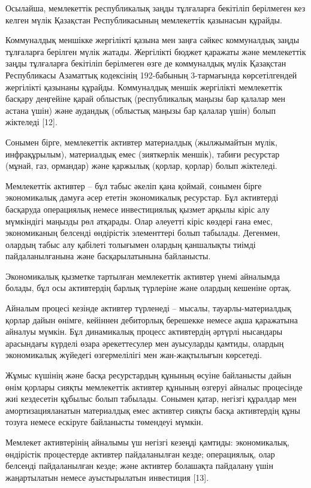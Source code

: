 \begin{multicols}{2}
Осылайша, мемлекеттік республикалық заңды тұлғаларға бекітіліп
берілмеген кез келген мүлік Қазақстан Республикасының мемлекеттік
қазынасын құрайды.

Коммуналдық меншікке жергілікті қазына мен заңға сәйкес коммуналдық
заңды тұлғаларға берілген мүлік жатады. Жергілікті бюджет қаражаты және
мемлекеттік заңды тұлғаларға бекітіліп берілмеген өзге де коммуналдық
мүлік Қазақстан Республикасы Азаматтық кодексінің 192-бабының
3-тармағында көрсетілгендей жергілікті қазынаны құрайды. Коммуналдық
меншік жергілікті мемлекеттік басқару деңгейіне қарай облыстық
(республикалық маңызы бар қалалар мен астана үшін) және аудандық
(облыстық маңызы бар қалалар үшін) болып жіктеледі {[}12{]}.

Сонымен бірге, мемлекеттік активтер материалдық (жылжымайтын мүлік,
инфрақұрылым), материалдық емес (зияткерлік меншік), табиғи ресурстар
(мұнай, газ, ормандар) және қаржылық (қорлар, қорлар) болып жіктеледі.

Мемлекеттік активтер -- бұл табыс әкеліп қана қоймай, сонымен бірге
экономикалық дамуға әсер ететін экономикалық ресурстар. Бұл активтерді
басқаруда операциялық немесе инвестициялық қызмет арқылы кіріс алу
мүмкіндігі маңызды рөл атқарады. Олар әлеуетті кіріс көздері ғана емес,
экономиканың белсенді өндірістік элементтері болып табылады. Дегенмен,
олардың табыс алу қабілеті толығымен олардың қаншалықты тиімді
пайдаланылғанына және басқарылатынына байланысты.

Экономикалық қызметке тартылған мемлекеттік активтер үнемі айналымда
болады, бұл осы активтердің барлық түрлеріне және олардың кешеніне
ортақ.

Айналым процесі кезінде активтер түрленеді -- мысалы,
тауарлы-материалдық қорлар дайын өнімге, кейіннен дебиторлық берешекке
немесе ақша қаражатына айналуы мүмкін. Бұл динамикалық процесс
активтердің әртүрлі нысандары арасындағы күрделі өзара әрекеттесулер мен
ауысуларды қамтиды, олардың экономикалық жүйедегі өзгермелілігі мен
жан-жақтылығын көрсетеді.

Жұмыс күшінің және басқа ресурстардың құнының өсуіне байланысты дайын
өнім қорлары сияқты мемлекеттік активтер құнының өзгеруі айналыс
процесінде жиі кездесетін құбылыс болып табылады. Сонымен қатар, негізгі
құралдар мен амортизацияланатын материалдық емес активтер сияқты басқа
активтердің құны тозуға немесе ескіруге байланысты төмендеуі мүмкін.

Мемлекет активтерінің айналымы үш негізгі кезеңді қамтиды: экономикалық,
өндірістік процестерде активтер пайдаланылған кезде; операциялық, олар
белсенді пайдаланылған кезде; және активтер болашақта пайдалану үшін
жаңартылатын немесе ауыстырылатын инвестиция {[}13{]}.


\end{multicols}
